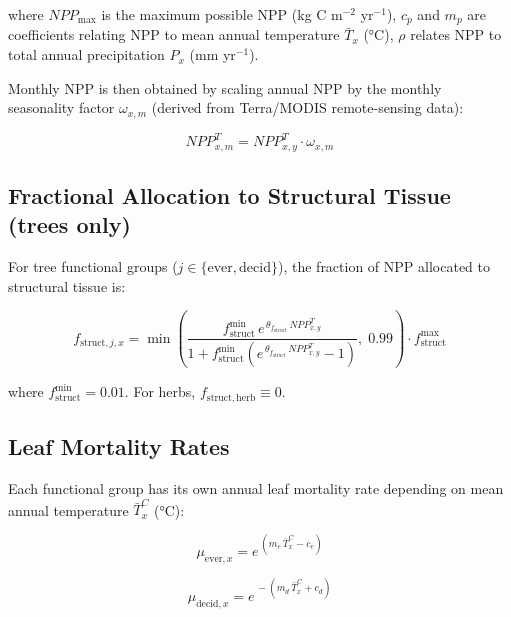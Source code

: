 \documentclass[12pt]{article}
\begin{document}
where $\mathit{NPP}_{\max}$ is the maximum possible NPP (kg C m$^{-2}$ yr$^{-1}$),
$c_p$ and $m_p$ are coefficients relating NPP to mean annual temperature $\bar{T}_x$
(°C), $\rho$ relates NPP to total annual precipitation $P_x$ (mm yr$^{-1}$).

Monthly NPP is then obtained by scaling annual NPP by the monthly seasonality
factor $\omega_{x,m}$ (derived from Terra/MODIS remote-sensing data):

\begin{equation}
    \mathit{NPP}^{T}_{x,m} = \mathit{NPP}^{T}_{x,y}\cdot\omega_{x,m}
    \label{eq:npp_monthly}
\end{equation}

\subsection{Fractional Allocation to Structural Tissue (trees only)}

For tree functional groups ($j \in \{\mathrm{ever, decid}\}$), the fraction of NPP
allocated to structural tissue is:

\begin{equation}
    f_{\mathrm{struct},j,x} =
        \min\!\left(
            \frac{f^{\min}_{\mathrm{struct}}\,
                  e^{\,\theta_{f_{\mathrm{struct}}}\,\mathit{NPP}^{T}_{x,y}}}
                 {1 + f^{\min}_{\mathrm{struct}}\!\left(
                      e^{\,\theta_{f_{\mathrm{struct}}}\,\mathit{NPP}^{T}_{x,y}} - 1\right)},\;
            0.99
        \right) \cdot f^{\max}_{\mathrm{struct}}
    \label{eq:fstruct}
\end{equation}

where $f^{\min}_{\mathrm{struct}} = 0.01$. For herbs, $f_{\mathrm{struct,herb}} \equiv 0$.

\subsection{Leaf Mortality Rates}

Each functional group has its own annual leaf mortality rate depending on mean annual
temperature $\bar{T}^C_x$ (°C):

\begin{equation}
    \mu_{\mathrm{ever},x} = e^{\,(m_{e}\,\bar{T}^C_x - c_{e})}
    \label{eq:mu_ever}
\end{equation}

\begin{equation}
    \mu_{\mathrm{decid},x} = e^{\,-(m_{d}\,\bar{T}^C_x + c_{d})}
    \label{eq:mu_decid}
\end{equation}
\end{document}
